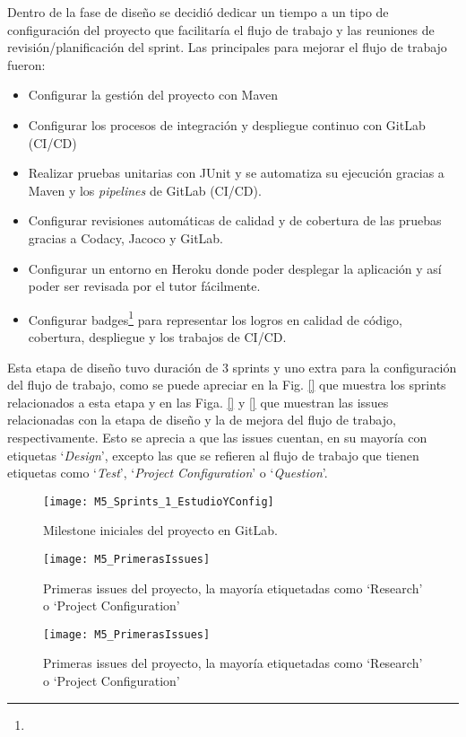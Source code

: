 Dentro de la fase de diseño se decidió dedicar un tiempo a un tipo de configuración del proyecto que facilitaría el flujo de trabajo y las reuniones de revisión/planificación del sprint. Las principales para mejorar el flujo de trabajo fueron:
\begin{itemize}
	\item Configurar la gestión del proyecto con Maven
	\item Configurar los procesos de integración y despliegue continuo con GitLab (CI/CD)
	\item Realizar pruebas unitarias con JUnit y se automatiza su ejecución gracias a Maven y los \textit{pipelines} de GitLab (CI/CD).
	\item Configurar revisiones automáticas de calidad y de cobertura de las pruebas gracias a Codacy, Jacoco y GitLab.
	\item Configurar un entorno en Heroku donde poder desplegar la aplicación y así poder ser revisada por el tutor fácilmente.
	\item Configurar badges\footnote{} para representar los logros en calidad de código, cobertura, despliegue y los trabajos de CI/CD.
\end{itemize}

Esta etapa de diseño tuvo duración de 3 sprints y uno extra para la configuración del flujo de trabajo, como se puede apreciar en la Fig. \ref{} que muestra los sprints relacionados a esta etapa y en las Figa. \ref{} y \ref{} que muestran las issues relacionadas con la etapa de diseño y la de mejora del flujo de trabajo, respectivamente. Esto se aprecia a que las issues cuentan, en su mayoría con etiquetas `\textit{Design}', excepto las que se refieren al flujo de trabajo que tienen etiquetas como `\textit{Test}', `\textit{Project Configuration}' o `\textit{Question}'.

\begin{figure}[!h]
	\centering
	\texttt{[image: M5\_Sprints\_1\_EstudioYConfig]}
	\caption{Milestone iniciales del proyecto en GitLab.}
	\label{fig:M5_Sprints_1_EstudioYConfig}
\end{figure}

\begin{figure}[!h]
	\centering
	\texttt{[image: M5\_PrimerasIssues]}
	\caption{Primeras issues del proyecto, la mayoría etiquetadas como `Research' o `Project Configuration'}
	\label{fig:M5_PrimerasIssues}
\end{figure}

\begin{figure}[!h]
	\centering
	\texttt{[image: M5\_PrimerasIssues]}
	\caption{Primeras issues del proyecto, la mayoría etiquetadas como `Research' o `Project Configuration'}
	\label{fig:M5_PrimerasIssues}
\end{figure}

